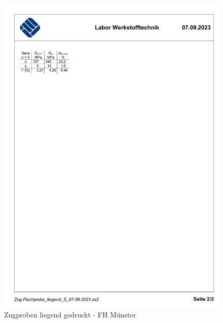   \begin{figure}[ht]
    \centering
    \includegraphics[width=1\textwidth]{bilder/Zug Flachprobe_liegend_S_S2.pdf}
    \caption{Zugproben liegend gedruckt - FH Münster}
    \label{ZugprobenS}
  \end{figure}
  \FloatBarrier
